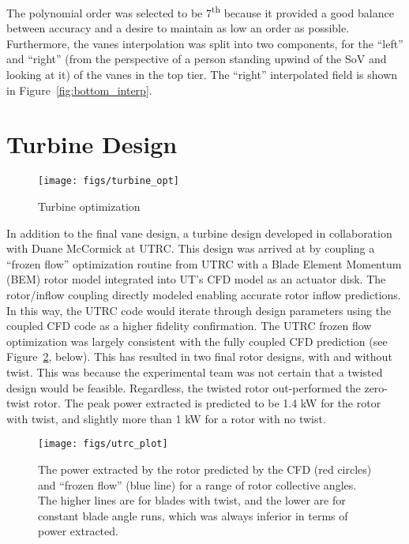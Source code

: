 The polynomial order was selected to be 7\textsuperscript{th} because it
provided a good balance between accuracy and a desire to maintain as low
an order as possible. Furthermore, the vanes interpolation was split
into two components, for the ``left'' and ``right'' (from the perspective of a
person standing upwind of the SoV and looking at it) of the vanes in the
top tier. The ``right'' interpolated field is shown in
Figure~\ref{fig:bottom_interp}. 

%
%

\section{Turbine Design}

  \begin{figure}[!htb]
   \begin{center}
    \texttt{[image: figs/turbine\_opt]}
    \caption{Turbine optimization}
    \label{fig:ut_turbine}
   \end{center}
  \end{figure}

In addition to the final vane design, a turbine design developed in
collaboration with Duane McCormick at UTRC. This design was arrived at
by coupling a ``frozen flow'' optimization routine from UTRC with a Blade
Element Momentum (BEM) rotor model integrated into UT's CFD model as an
actuator disk. The rotor/inflow coupling directly modeled enabling
accurate rotor inflow predictions. In this way, the UTRC code would
iterate through design parameters using the coupled CFD code as a higher
fidelity confirmation. The UTRC frozen flow optimization was largely
consistent with the fully coupled CFD prediction (see
Figure~\ref{fig:UTRC_turbine}, below). This has resulted in two final
rotor designs, with and without twist. This was because the experimental
team was not certain that a twisted design would be
feasible. Regardless, the twisted rotor out-performed the zero-twist
rotor. The peak power extracted is predicted to be 1.4 kW for the rotor
with twist, and slightly more than 1 kW for a rotor with no twist. 

  \begin{figure}[!htb]
   \begin{center}
    \texttt{[image: figs/utrc\_plot]}
    \caption{The power extracted by the rotor predicted by the CFD (red
    circles) and ``frozen flow'' (blue line) for a range of rotor
    collective angles. The higher lines are for blades with twist, and
    the lower are for constant blade angle runs, which was always
    inferior in terms of power extracted.}
    \label{fig:UTRC_turbine}
   \end{center}
  \end{figure}


